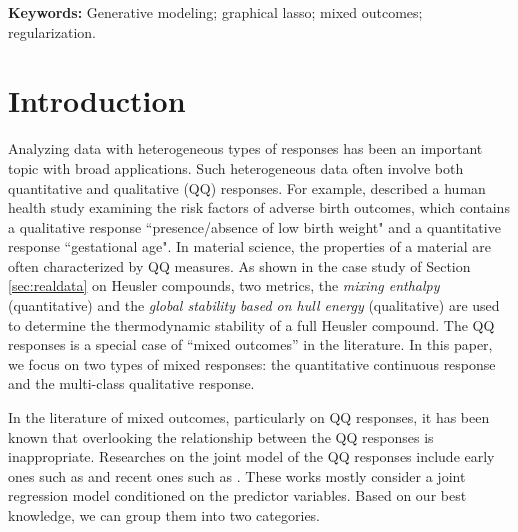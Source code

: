 \documentclass[12pt]{article}
\begin{document}
\textbf{Keywords:} Generative modeling; graphical lasso; mixed outcomes; regularization.

\section{Introduction}
Analyzing data with heterogeneous types of responses has been an important topic with broad applications.
Such heterogeneous data often involve both quantitative and qualitative (QQ) responses.
For example,
\cite{klein2019mixed} described a human health study examining the risk factors of adverse birth outcomes, which contains a qualitative response ``presence/absence of low birth weight" and a quantitative response ``gestational age".
In material science, the properties of a material are often characterized by QQ measures.
As shown in the case study of Section \ref{sec:realdata} on Heusler compounds, two metrics, the \emph{mixing enthalpy} (quantitative) and the \emph{global stability based on hull energy} (qualitative) are used to determine the thermodynamic stability of a full Heusler compound.
The QQ responses is a special case of ``mixed outcomes'' in the literature.
In this paper, we focus on two types of mixed responses: the quantitative continuous response and the multi-class qualitative response.

In the literature of mixed outcomes, particularly on QQ responses, it has been known that overlooking the relationship between the QQ responses is inappropriate.
Researches on the joint model of the QQ responses include early ones such as \cite{fitzmaurice1995regression, moustaki2000generalized, dunson2000bayesian, gueorguieva2001correlated, dunson2003dynamic} and recent ones such as \cite{deng2015qq, kurum2016time, kang2018bayesian, amini2018longitudinal, klein2019mixed}.
These works mostly consider a joint regression model conditioned on the predictor variables.
Based on our best knowledge, we can group them into two categories.
\end{document}

